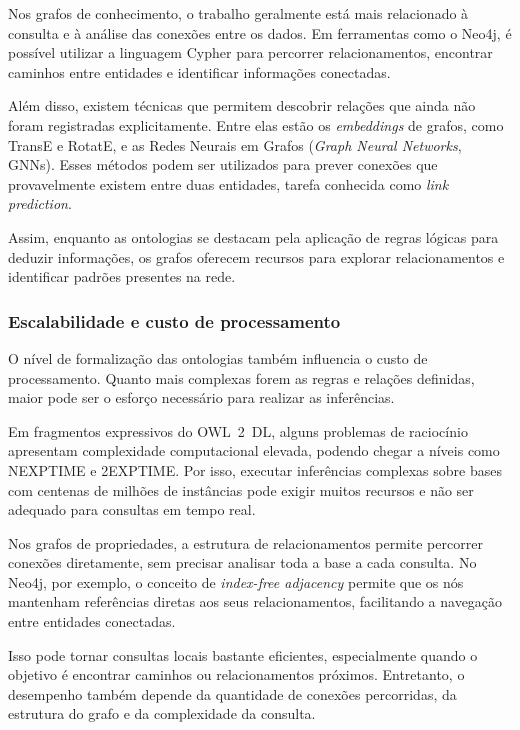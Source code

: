 \documentclass[12pt, a4paper]{article}
\begin{document}
Nos grafos de conhecimento, o trabalho geralmente está mais relacionado à consulta e à análise das conexões entre os dados. Em ferramentas como o Neo4j, é possível utilizar a linguagem Cypher para percorrer relacionamentos, encontrar caminhos entre entidades e identificar informações conectadas.

Além disso, existem técnicas que permitem descobrir relações que ainda não foram registradas explicitamente. Entre elas estão os \textit{embeddings} de grafos, como TransE e RotatE, e as Redes Neurais em Grafos (\textit{Graph Neural Networks}, GNNs). Esses métodos podem ser utilizados para prever conexões que provavelmente existem entre duas entidades, tarefa conhecida como \textit{link prediction}.

Assim, enquanto as ontologias se destacam pela aplicação de regras lógicas para deduzir informações, os grafos oferecem recursos para explorar relacionamentos e identificar padrões presentes na rede.

\subsubsection{Escalabilidade e custo de processamento}

O nível de formalização das ontologias também influencia o custo de processamento. Quanto mais complexas forem as regras e relações definidas, maior pode ser o esforço necessário para realizar as inferências.

Em fragmentos expressivos do OWL~2~DL, alguns problemas de raciocínio apresentam complexidade computacional elevada, podendo chegar a níveis como NEXPTIME e 2EXPTIME. Por isso, executar inferências complexas sobre bases com centenas de milhões de instâncias pode exigir muitos recursos e não ser adequado para consultas em tempo real.

Nos grafos de propriedades, a estrutura de relacionamentos permite percorrer conexões diretamente, sem precisar analisar toda a base a cada consulta. No Neo4j, por exemplo, o conceito de \textit{index-free adjacency} permite que os nós mantenham referências diretas aos seus relacionamentos, facilitando a navegação entre entidades conectadas.

Isso pode tornar consultas locais bastante eficientes, especialmente quando o objetivo é encontrar caminhos ou relacionamentos próximos. Entretanto, o desempenho também depende da quantidade de conexões percorridas, da estrutura do grafo e da complexidade da consulta.
\end{document}
